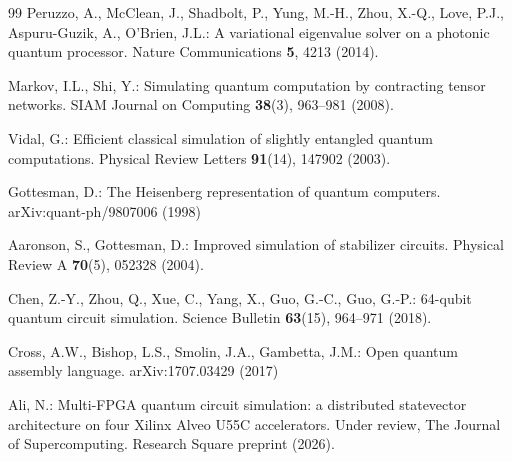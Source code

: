 \begin{thebibliography}{99}
Peruzzo, A., McClean, J., Shadbolt, P., Yung, M.-H., Zhou, X.-Q., Love, P.J., Aspuru-Guzik, A., O'Brien, J.L.: A variational eigenvalue solver on a photonic quantum processor. Nature Communications \textbf{5}, 4213 (2014). 

Markov, I.L., Shi, Y.: Simulating quantum computation by contracting tensor networks. SIAM Journal on Computing \textbf{38}(3), 963--981 (2008). 

Vidal, G.: Efficient classical simulation of slightly entangled quantum computations. Physical Review Letters \textbf{91}(14), 147902 (2003). 

Gottesman, D.: The Heisenberg representation of quantum computers. arXiv:quant-ph/9807006 (1998)

Aaronson, S., Gottesman, D.: Improved simulation of stabilizer circuits. Physical Review A \textbf{70}(5), 052328 (2004). 

Chen, Z.-Y., Zhou, Q., Xue, C., Yang, X., Guo, G.-C., Guo, G.-P.: 64-qubit quantum circuit simulation. Science Bulletin \textbf{63}(15), 964--971 (2018). 

Cross, A.W., Bishop, L.S., Smolin, J.A., Gambetta, J.M.: Open quantum assembly language. arXiv:1707.03429 (2017)

Ali, N.: Multi-FPGA quantum circuit simulation: a distributed statevector architecture on four Xilinx Alveo U55C accelerators. Under review, The Journal of Supercomputing. Research Square preprint (2026). 

\end{thebibliography}
